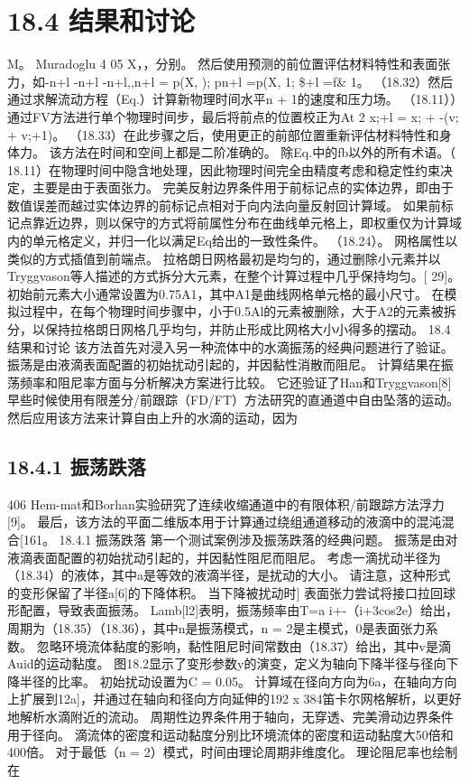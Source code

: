 \documentclass[UTF8,11pt,a4paper,openany,fontset=fandol]{ctexbook}
\begin{document}
\section{18.4 结果和讨论}
M。 Muradoglu 4 05 X，，分别。 然后使用预测的前位置评估材料特性和表面张力，如-n+l -n+l -n+l,,n+l = p(X, ); pn+l =p(X, 1; \$+l =f\& 1。 （18.32）然后通过求解流动方程（Eq.）计算新物理时间水平n + 1的速度和压力场。 （18.11））通过FV方法进行单个物理时间步，最后将前点的位置校正为At 2 x;+l = x; + -(v; + v;+1)。 （18.33）在此步骤之后，使用更正的前部位置重新评估材料特性和身体力。 该方法在时间和空间上都是二阶准确的。 除Eq.中的fb以外的所有术语。（ 18.11）在物理时间中隐含地处理，因此物理时间完全由精度考虑和稳定性约束决定，主要是由于表面张力。 完美反射边界条件用于前标记点的实体边界，即由于数值误差而越过实体边界的前标记点相对于向内法向量反射回计算域。 如果前标记点靠近边界，则以保守的方式将前属性分布在曲线单元格上，即权重仅为计算域内的单元格定义，并归一化以满足Eq给出的一致性条件。 （18.24）。 网格属性以类似的方式插值到前端点。 拉格朗日网格最初是均匀的，通过删除小元素并以Tryggvason等人描述的方式拆分大元素，在整个计算过程中几乎保持均匀。[ 29]。 初始前元素大小通常设置为0.75A1，其中A1是曲线网格单元格的最小尺寸。 在模拟过程中，在每个物理时间步骤中，小于0.5Al的元素被删除，大于A2的元素被拆分，以保持拉格朗日网格几乎均匀，并防止形成比网格大小小得多的摆动。 18.4 结果和讨论 该方法首先对浸入另一种流体中的水滴振荡的经典问题进行了验证。 振荡是由液滴表面配置的初始扰动引起的，并因黏性消散而阻尼。 计算结果在振荡频率和阻尼率方面与分析解决方案进行比较。 它还验证了Han和Tryggvason[8]早些时候使用有限差分/前跟踪（FD/FT）方法研究的直通道中自由坠落的运动。 然后应用该方法来计算自由上升的水滴的运动，因为

\subsection{18.4.1 振荡跌落}
406 Hem-mat和Borhan实验研究了连续收缩通道中的有限体积/前跟踪方法浮力[9]。 最后，该方法的平面二维版本用于计算通过绕组通道移动的液滴中的混沌混合[161。 18.4.1 振荡跌落 第一个测试案例涉及振荡跌落的经典问题。 振荡是由对液滴表面配置的初始扰动引起的，并因黏性阻尼而阻尼。 考虑一滴扰动半径为（18.34）的液体，其中a是等效的液滴半径，是扰动的大小。 请注意，这种形式的变形保留了半径a[6]的下降体积。 当下降被扰动时] 表面张力尝试将接口拉回球形配置，导致表面振荡。 Lamb[l2]表明，振荡频率由T=a i+-（i+3cos2e）给出，周期为（18.35）（18.36），其中n是振荡模式，n = 2是主模式，0是表面张力系数。 忽略环境流体黏度的影响，黏性阻尼时间常数由（18.37）给出，其中v是滴Auid的运动黏度。 图18.2显示了变形参数y的演变，定义为轴向下降半径与径向下降半径的比率。 初始扰动设置为C = 0.05。 计算域在径向方向为6a，在轴向方向上扩展到12a]，并通过在轴向和径向方向延伸的192 x 384笛卡尔网格解析，以更好地解析水滴附近的流动。 周期性边界条件用于轴向，无穿透、完美滑动边界条件用于径向。 滴流体的密度和运动黏度分别比环境流体的密度和运动黏度大50倍和400倍。 对于最低（n = 2）模式，时间由理论周期非维度化。 理论阻尼率也绘制在
\end{document}
